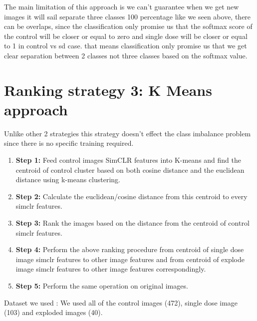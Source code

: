 The main limitation of this approach is we can't guarantee when we get new images it will sail separate three classes 100 percentage like we seen above, there can be overlaps, since the classification only promise us that the softmax score of the control will be closer or equal to zero and  single dose will be closer or equal to 1 in control vs sd case. that means classification only promise us that we get clear separation between 2 classes not three classes based on the softmax value.



\section{Ranking strategy 3: K Means approach}

Unlike other 2 strategies this strategy doesn't effect the class imbalance problem since there is no specific training required.

\begin{enumerate}
  \item \textbf{Step 1:} Feed control images SimCLR features into K-means and find the centroid of control cluster based on both cosine distance and the euclidean distance using k-means clustering. 
 
  
  \item \textbf{Step 2:} Calculate the euclidean/cosine distance from this centroid to every simclr features.
  \item \textbf{Step 3:} Rank the images based on the distance from the centroid of control simclr features.
  \item \textbf{Step 4:} Perform the above ranking procedure from centroid of single dose image simclr features to other image features and from centroid of explode image simclr features to other image features correspondingly.
  
  \item \textbf{Step 5:} Perform the same operation  on original images.
\end{enumerate}
Dataset we used : We used all of the control images (472),
single dose image (103) and exploded images (40).

